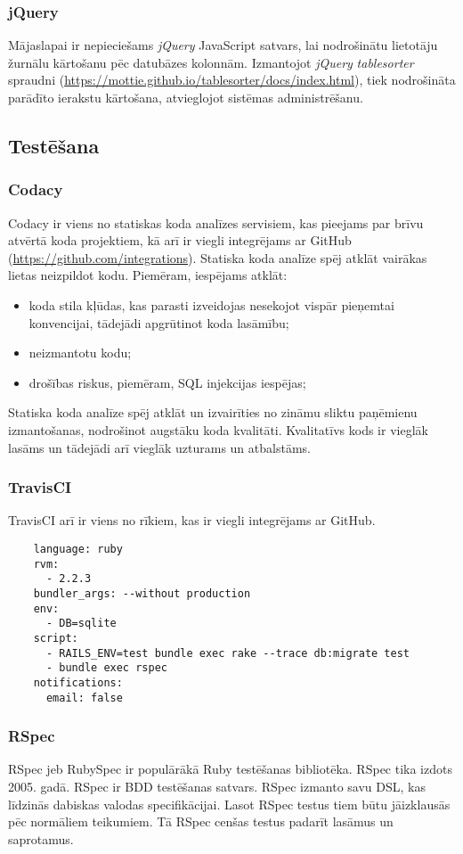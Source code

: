 \subsubsection{jQuery}
Mājaslapai ir nepieciešams \textit{jQuery} JavaScript satvars, lai nodrošinātu lietotāju žurnālu kārtošanu pēc datubāzes kolonnām. Izmantojot \textit{jQuery} \textit{tablesorter} spraudni (\url{https://mottie.github.io/tablesorter/docs/index.html}), tiek nodrošināta parādīto ierakstu kārtošana, atvieglojot sistēmas administrēšanu.

\subsection{Testēšana} \label{Testing}

\subsubsection{Codacy}
Codacy ir viens no statiskas koda analīzes servisiem, kas pieejams par brīvu atvērtā koda projektiem, kā arī ir viegli integrējams ar GitHub (\url{https://github.com/integrations}). Statiska koda analīze spēj atklāt vairākas lietas neizpildot kodu.
Piemēram, iespējams atklāt:
\begin{itemize}
	\item koda stila kļūdas, kas parasti izveidojas nesekojot vispār pieņemtai konvencijai, tādejādi apgrūtinot koda lasāmību;
	\item neizmantotu kodu;
	\item drošības riskus, piemēram, SQL injekcijas iespējas;
\end{itemize}
Statiska koda analīze spēj atklāt un izvairīties no zināmu sliktu paņēmienu izmantošanas, nodrošinot augstāku koda kvalitāti. Kvalitatīvs kods ir vieglāk lasāms un tādejādi arī vieglāk uzturams un atbalstāms.

\subsubsection{TravisCI}
TravisCI arī ir viens no rīkiem, kas ir viegli integrējams ar GitHub.
\begin{lstlisting}
	language: ruby
	rvm:
	  - 2.2.3
	bundler_args: --without production
	env:
	  - DB=sqlite
	script:
	  - RAILS_ENV=test bundle exec rake --trace db:migrate test
	  - bundle exec rspec
	notifications:
	  email: false
\end{lstlisting}

\subsubsection{RSpec}
RSpec jeb RubySpec ir populārākā Ruby testēšanas bibliotēka. RSpec tika izdots 2005. gadā.
\cite{shayRspec}
RSpec ir BDD testēšanas satvars. RSpec izmanto savu DSL, kas līdzinās dabiskas valodas specifikācijai. Lasot RSpec testus tiem būtu jāizklausās pēc normāliem teikumiem. Tā RSpec cenšas testus padarīt lasāmus un saprotamus.
